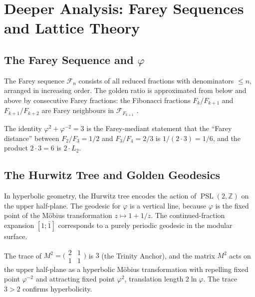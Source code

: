 
\section{Deeper Analysis: Farey Sequences and Lattice Theory}%
\label{sec:deeper-analysis}

\subsection{The Farey Sequence and $\varphi$}

The Farey sequence $\mathcal{F}_{n}$ consists of all reduced
fractions with denominators $\leq n$, arranged in increasing
order.
The golden ratio is approximated from below and above by
consecutive Farey fractions: the Fibonacci fractions
$F_{k}/F_{k+1}$ and $F_{k+1}/F_{k+2}$ are Farey neighbours
in $\mathcal{F}_{F_{k+1}}$ \cite{olds_pell}.

The identity $\varphi^{2}+\varphi^{-2}=3$ is the
Farey-mediant statement that the ``Farey distance'' between
$F_{2}/F_{3} = 1/2$ and $F_{3}/F_{4} = 2/3$ is
$1/(2 \cdot 3) = 1/6$, and the product $2 \cdot 3 = 6$
is $2 \cdot L_{2}$.

\subsection{The Hurwitz Tree and Golden Geodesics}

In hyperbolic geometry, the Hurwitz tree encodes the action
of $\operatorname{PSL}(2,\mathbb{Z})$ on the upper half-plane.
The geodesic for $\varphi$ is a vertical line, because $\varphi$
is the fixed point of the M\"{o}bius transformation $z \mapsto 1+1/z$.
The continued-fraction expansion $[1;\bar{1}]$ corresponds to
a purely periodic geodesic in the modular surface.

The trace of $M^{2} = \bigl(\begin{smallmatrix}2&1\\1&1\end{smallmatrix}\bigr)$
is $3$ (the Trinity Anchor), and the matrix $M^{2}$ acts on
the upper half-plane as a hyperbolic M\"{o}bius transformation
with repelling fixed point $\varphi^{-2}$ and attracting fixed
point $\varphi^{2}$, translation length $2\ln\varphi$.
The trace $3 > 2$ confirms hyperbolicity.

